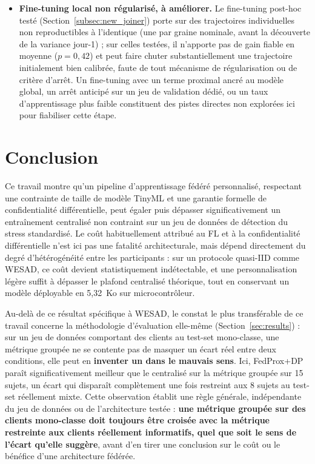 \documentclass{acmart}
\begin{document}
\begin{itemize}
  permet pas de trancher si son apparente stabilité reflète un profil
  réellement plus robuste ou un tirage favorable ($\approx 33\,\%$ de
  chances d'observer 5/5 réalisations hautes par hasard sous le même taux
  que le sujet~2). Caractériser ce taux sur les 15 sujets nécessiterait de
  répéter l'étude à 20 réalisations sur chacun.
  \item \textbf{Fine-tuning local non régularisé, à améliorer.} Le
  fine-tuning post-hoc testé (Section~\ref{subsec:new_joiner}) porte sur des
  trajectoires individuelles non reproductibles à l'identique (une par
  graine nominale, avant la découverte de la variance jour-1) ; sur celles
  testées, il n'apporte pas de gain fiable en moyenne ($p=0{,}42$) et peut
  faire chuter substantiellement une trajectoire initialement bien calibrée,
  faute de tout mécanisme de
  régularisation ou de critère d'arrêt. Un fine-tuning avec un terme
  proximal ancré au modèle global, un arrêt anticipé sur un jeu de
  validation dédié, ou un taux d'apprentissage plus faible constituent des
  pistes directes non explorées ici pour fiabiliser cette étape.
\end{itemize}

\section{Conclusion}

Ce travail montre qu'un pipeline d'apprentissage fédéré personnalisé,
respectant une contrainte de taille de modèle TinyML et une garantie formelle
de confidentialité différentielle, peut égaler puis dépasser significativement
un entraînement centralisé non contraint sur un jeu de données de détection
du stress standardisé. Le coût habituellement attribué au FL et à la
confidentialité différentielle n'est ici pas une fatalité architecturale,
mais dépend directement du degré d'hétérogénéité entre les participants : sur
un protocole quasi-IID comme WESAD, ce coût devient statistiquement
indétectable, et une personnalisation légère suffit à dépasser le plafond
centralisé théorique, tout en conservant un modèle déployable en 5,32~Ko sur
microcontrôleur.

Au-delà de ce résultat spécifique à WESAD, le constat le plus transférable de
ce travail concerne la méthodologie d'évaluation elle-même
(Section~\ref{sec:results}) : sur un jeu de données comportant des clients au
test-set mono-classe, une métrique groupée ne se contente pas de masquer un
écart réel entre deux conditions, elle peut en \textbf{inventer un dans le
mauvais sens}. Ici, FedProx+DP paraît significativement meilleur que le
centralisé sur la métrique groupée sur 15 sujets, un écart qui disparaît
complètement une fois restreint aux 8 sujets au test-set réellement mixte.
Cette observation établit une règle générale, indépendante du jeu de données
ou de l'architecture testée : \textbf{une métrique groupée sur des clients
mono-classe doit toujours être croisée avec la métrique restreinte aux
clients réellement informatifs, quel que soit le sens de l'écart qu'elle
suggère}, avant d'en tirer une conclusion sur le coût ou le bénéfice d'une
architecture fédérée.

\printbibliography
\end{document}
